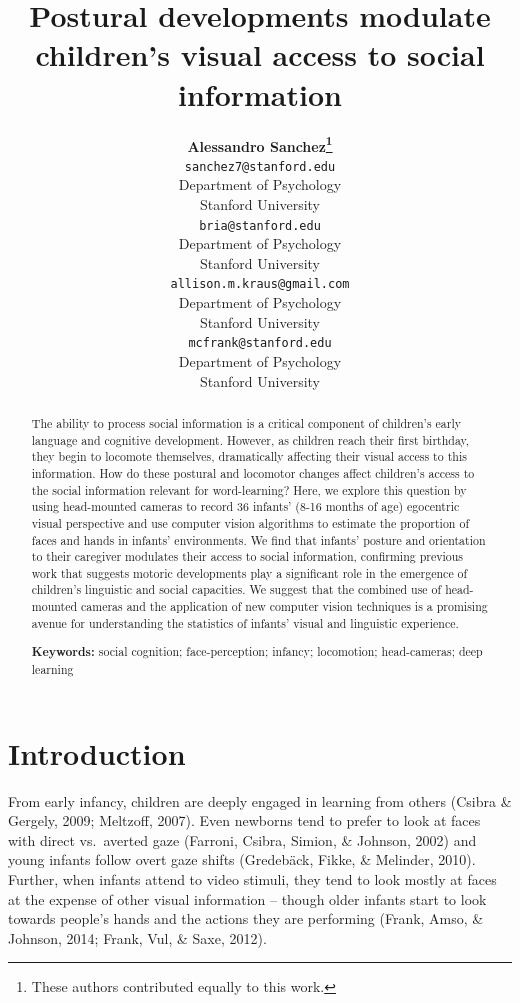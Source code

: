 \documentclass[10pt, letterpaper]{article}
\title{Postural developments modulate children's visual access to social
information}
\author{{\large \bf Alessandro Sanchez\thanks{These authors contributed equally to this work.}} \\ \texttt{sanchez7@stanford.edu} \\ Department of Psychology \\ Stanford University \And {\large \bf Bria Long\footnotemark[1]}  \\ \texttt{bria@stanford.edu} \\ Department of Psychology \\ Stanford University \And {\large \bf Allison M. Kraus} \\ \texttt{allison.m.kraus@gmail.com} \\ Department of Psychology \\ Stanford University \And {\large \bf Michael C. Frank} \\ \texttt{mcfrank@stanford.edu} \\ Department of Psychology \\ Stanford University}
\begin{document}
\maketitle

\begin{abstract}
The ability to process social information is a critical component of
children's early language and cognitive development. However, as
children reach their first birthday, they begin to locomote themselves,
dramatically affecting their visual access to this information. How do
these postural and locomotor changes affect children's access to the
social information relevant for word-learning? Here, we explore this
question by using head-mounted cameras to record 36 infants' (8-16
months of age) egocentric visual perspective and use computer vision
algorithms to estimate the proportion of faces and hands in infants'
environments. We find that infants' posture and orientation to their
caregiver modulates their access to social information, confirming
previous work that suggests motoric developments play a significant role
in the emergence of children's linguistic and social capacities. We
suggest that the combined use of head-mounted cameras and the
application of new computer vision techniques is a promising avenue for
understanding the statistics of infants' visual and linguistic
experience.

\textbf{Keywords:}
social cognition; face-perception; infancy; locomotion; head-cameras;
deep learning
\end{abstract}

\newcommand{\wrapmf}[1]{#1}




\section{Introduction}\label{introduction}

From early infancy, children are deeply engaged in learning from others
(Csibra \& Gergely, 2009; Meltzoff, 2007). Even newborns tend to prefer
to look at faces with direct vs.~averted gaze (Farroni, Csibra, Simion,
\& Johnson, 2002) and young infants follow overt gaze shifts
(Gredeb\wrapmf{\"{a}}ck, Fikke, \& Melinder, 2010). Further, when
infants attend to video stimuli, they tend to look mostly at faces at
the expense of other visual information -- though older infants start to
look towards people's hands and the actions they are performing (Frank,
Amso, \& Johnson, 2014; Frank, Vul, \& Saxe, 2012).
\end{document}
